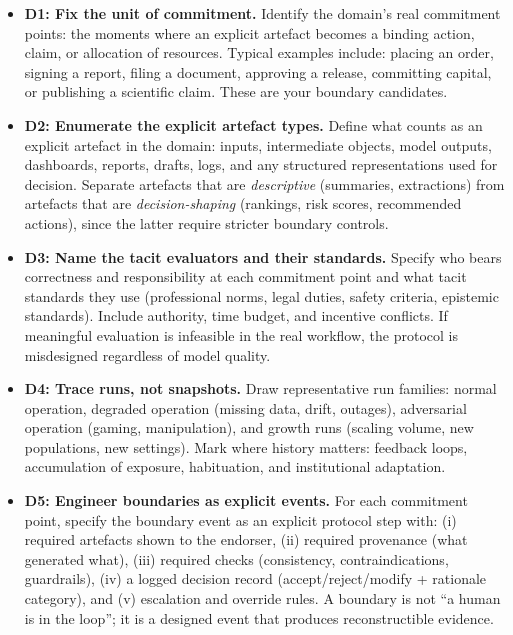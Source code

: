 \begin{itemize}
  \item \textbf{D1: Fix the unit of commitment.}
        Identify the domain’s real commitment points: the moments where an explicit artefact becomes a
        binding action, claim, or allocation of resources. Typical examples include: placing an order,
        signing a report, filing a document, approving a release, committing capital, or publishing a
        scientific claim. These are your boundary candidates.

  \item \textbf{D2: Enumerate the explicit artefact types.}
        Define what counts as an explicit artefact in the domain: inputs, intermediate objects, model
        outputs, dashboards, reports, drafts, logs, and any structured representations used for decision.
        Separate artefacts that are \emph{descriptive} (summaries, extractions) from artefacts that are
        \emph{decision-shaping} (rankings, risk scores, recommended actions), since the latter require
        stricter boundary controls.

  \item \textbf{D3: Name the tacit evaluators and their standards.}
        Specify who bears correctness and responsibility at each commitment point and what tacit
        standards they use (professional norms, legal duties, safety criteria, epistemic standards).
        Include authority, time budget, and incentive conflicts. If meaningful evaluation is infeasible
        in the real workflow, the protocol is misdesigned regardless of model quality.

  \item \textbf{D4: Trace runs, not snapshots.}
        Draw representative run families: normal operation, degraded operation (missing data, drift,
        outages), adversarial operation (gaming, manipulation), and growth runs (scaling volume, new
        populations, new settings). Mark where history matters: feedback loops, accumulation of exposure,
        habituation, and institutional adaptation.

  \item \textbf{D5: Engineer boundaries as explicit events.}
        For each commitment point, specify the boundary event as an explicit protocol step with:
        (i) required artefacts shown to the endorser, (ii) required provenance (what generated what),
        (iii) required checks (consistency, contraindications, guardrails), (iv) a logged decision record
        (accept/reject/modify + rationale category), and (v) escalation and override rules. A boundary is
        not ``a human is in the loop''; it is a designed event that produces reconstructible evidence.


\end{itemize}
